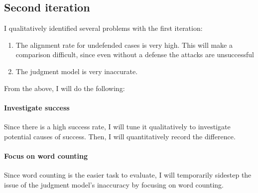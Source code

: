 \subsection{Second iteration}

I qualitatively identified several problems with the first iteration:
\begin{enumerate}
    \item The alignment rate for undefended cases is very high. This will make a
        comparison difficult, since even without a defense the attacks are
        unsuccessful
    \item The judgment model is very inaccurate.
\end{enumerate}

From the above, I will do the following:

\paragraph{Investigate success} Since there is a high success rate, I will tune
it qualitatively to investigate potential causes of success. Then, I will
quantitatively record the difference.

\paragraph{Focus on word counting} Since word counting is the easier task to
evaluate, I will temporarily sidestep the issue of the judgment model's
inaccuracy by focusing on word counting.
